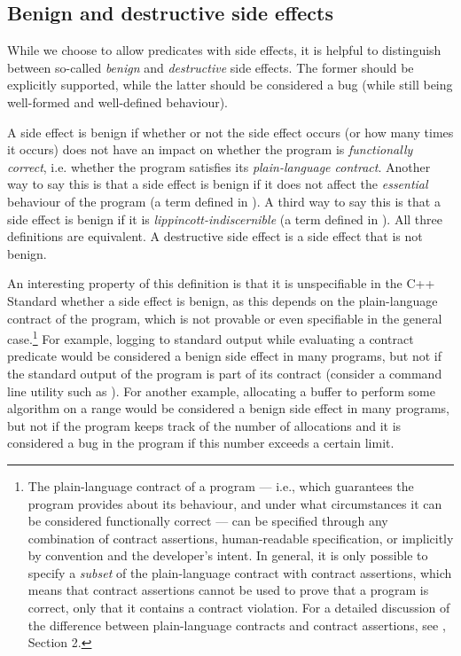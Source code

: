 \subsection{Benign and destructive side effects}
\label{subsec:benign}

While we choose to allow predicates with side effects, it is helpful to distinguish between so-called \emph{benign} and \emph{destructive} side effects. The former should be explicitly supported, while the latter should be considered a bug (while still being well-formed and well-defined behaviour).

A side effect is benign if whether or not the side effect occurs (or how many times it occurs) does not have an impact on whether the program is \emph{functionally correct}, i.e. whether the program satisfies its \emph{plain-language contract}. Another way to say this is that a side effect is benign if it does not affect the \emph{essential} behaviour of the program (a term defined in \cite{P2053R1}). A third way to say this is that a side effect is benign if it is \emph{lippincott-indiscernible} (a term defined in \cite{P2461R1}). All three definitions are equivalent. A destructive side effect is a side effect that is not benign. 

An interesting property of this definition is that it is unspecifiable in the C++ Standard whether a side effect is benign, as this depends on the plain-language contract of the program, which is not provable or even specifiable in the general case.\footnote{The plain-language contract of a program --- i.e., which guarantees the program provides about its behaviour, and under what circumstances it can be considered functionally correct --- can be specified through any combination of contract assertions, human-readable specification, or implicitly by convention and the developer's intent. In general, it is only possible to specify a \emph{subset} of the plain-language contract with contract assertions, which means that contract assertions cannot be used to prove that a program is correct, only that it contains a contract violation. For a detailed discussion of the difference between plain-language contracts and contract assertions, see \cite{P2900R6}, Section 2.} For example, logging to standard output while evaluating a contract predicate would be considered a benign side effect in many programs, but not if the standard output of the program is part of its contract (consider a command line utility such as ). For another example, allocating a buffer to perform some algorithm on a range would be considered a benign side effect in many programs, but not if the program keeps track of the number of allocations and it is considered a bug in the program if this number exceeds a certain limit.

